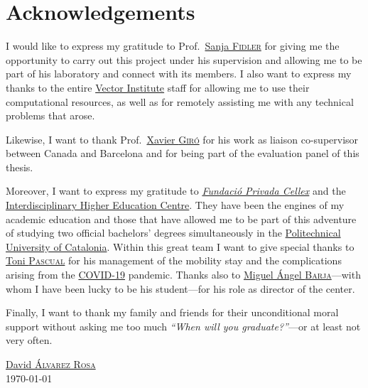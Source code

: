 \chapter*{Acknowledgements}


I would like to express my gratitude to Prof.\
\href{https://www.cs.utoronto.ca/~fidler/}{Sanja \textsc{Fidler}} for giving me
the opportunity to carry out this project under his supervision and allowing me
to be part of his laboratory and connect with its members. I also want to
express my thanks to the entire \href{https://vectorinstitute.ai/}{Vector
  Institute} staff for allowing me to use their computational resources, as
well as for remotely assisting me with any technical problems that arose.

Likewise, I want to thank Prof.\
\href{https://imatge.upc.edu/web/people/xavier-giro}{Xavier \textsc{Giró}} for
his work as liaison co-supervisor between Canada and Barcelona and for being
part of the evaluation panel of this thesis.

Moreover, I want to express my gratitude to
\href{http://cellex-mpq.icfo.eu/about_2/}{\itshape Fundació Privada Cellex} and
the \href{https://cfis.upc.edu/en}{Interdisciplinary Higher Education
  Centre}. They have been the engines of my academic education and those that
have allowed me to be part of this adventure of studying two official
bachelors' degrees simultaneously in the
\href{https://www.upc.edu/en}{Politechnical University of Catalonia}. Within
this great team I want to give special thanks to
\href{https://spcom.upc.edu/en/people/antonio-pascual-iserte}{Toni
  \textsc{Pascual}} for his management of the mobility stay and the
complications arising from the
\href{https://en.wikipedia.org/wiki/Covid-19}{COVID-19} pandemic. Thanks also
to \href{https://mat.upc.edu/en/people/miguel.angel.barja}{Miguel Ángel
  \textsc{Barja}}---with whom I have been lucky to be his student---for his
role as director of the center.

Finally, I want to thank my family and friends for their unconditional moral
support without asking me too much \textit{``When will you graduate?''}---or at
least not very often.

\begin{flushright}
  \href{https://david.alvarezrosa.com/}{David \textsc{Álvarez Rosa}}\\
  \today
\end{flushright}

\begin{center}
\end{center}



\tableofcontents
\listoffigures
\listoftables
{}